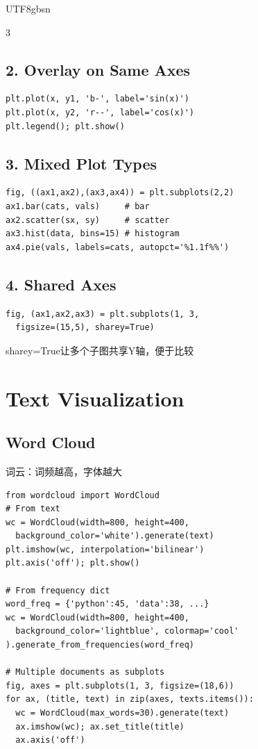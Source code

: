 \documentclass[9pt,landscape,a4paper]{article}
\newcommand{\zhint}[1]{{\scriptsize\color{gray!70!black}#1}}
\begin{document}
\begin{CJK}{UTF8}{gbsn}
\begin{multicols}{3}
\subsection{2. Overlay on Same Axes}
\begin{lstlisting}
plt.plot(x, y1, 'b-', label='sin(x)')
plt.plot(x, y2, 'r--', label='cos(x)')
plt.legend(); plt.show()
\end{lstlisting}

\subsection{3. Mixed Plot Types}
\begin{lstlisting}
fig, ((ax1,ax2),(ax3,ax4)) = plt.subplots(2,2)
ax1.bar(cats, vals)     # bar
ax2.scatter(sx, sy)     # scatter
ax3.hist(data, bins=15) # histogram
ax4.pie(vals, labels=cats, autopct='%1.1f%%')
\end{lstlisting}

\subsection{4. Shared Axes}
\begin{lstlisting}
fig, (ax1,ax2,ax3) = plt.subplots(1, 3,
  figsize=(15,5), sharey=True)
\end{lstlisting}
\zhint{sharey=True让多个子图共享Y轴，便于比较}

\section{Text Visualization}

\subsection{Word Cloud}
\zhint{词云：词频越高，字体越大}
\begin{lstlisting}
from wordcloud import WordCloud
# From text
wc = WordCloud(width=800, height=400,
  background_color='white').generate(text)
plt.imshow(wc, interpolation='bilinear')
plt.axis('off'); plt.show()

# From frequency dict
word_freq = {'python':45, 'data':38, ...}
wc = WordCloud(width=800, height=400,
  background_color='lightblue', colormap='cool'
).generate_from_frequencies(word_freq)

# Multiple documents as subplots
fig, axes = plt.subplots(1, 3, figsize=(18,6))
for ax, (title, text) in zip(axes, texts.items()):
  wc = WordCloud(max_words=30).generate(text)
  ax.imshow(wc); ax.set_title(title)
  ax.axis('off')
\end{lstlisting}


\end{multicols}
\end{CJK}
\end{document}

